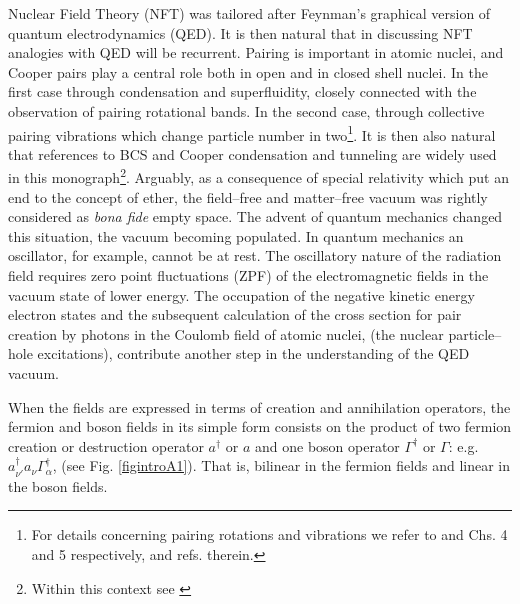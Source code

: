 Nuclear Field Theory (NFT) was tailored after Feynman's graphical version of quantum electrodynamics (QED). It is then natural that in discussing NFT analogies with QED will be recurrent. Pairing is important in atomic nuclei, and Cooper pairs play a central role both in open and in closed shell nuclei. In the first case through condensation and superfluidity, closely connected with the observation of pairing rotational bands. In the second case, through collective pairing vibrations which change particle number in two\footnote{For details concerning pairing rotations and vibrations we refer to \cite{Bes:77} and \cite{Brink:05} Chs. 4 and 5 respectively, and refs. therein.}. It is then also natural that references to BCS and Cooper condensation and tunneling are widely used in this monograph\footnote{Within this context see \cite{Broglia:13}}. Arguably, as a consequence of special relativity which put an end to the concept of ether, the field--free and matter--free vacuum was rightly considered as \textit{bona fide} empty space. The advent of quantum mechanics changed this situation, the vacuum becoming populated. In quantum mechanics an oscillator, for example, cannot be at rest. The oscillatory nature of the radiation field requires zero point fluctuations (ZPF) of the electromagnetic fields in the vacuum state of lower energy. The occupation of the negative kinetic energy electron states and the subsequent calculation of the cross section for pair creation by photons in the Coulomb field of atomic nuclei, (the nuclear particle--hole excitations), contribute another step in the understanding of the QED vacuum.


When the fields are expressed in terms of creation and annihilation operators, the fermion and boson fields in its simple form consists on the product of two fermion creation or destruction operator $a^\dagger$ or $a$ and one boson operator $\Gamma^\dagger$ or $\Gamma$: e.g. $a^\dagger_{\nu'}a_\nu\Gamma_\alpha^\dagger$, (see Fig. \ref{figintroA1}). That is,  bilinear in the fermion fields and linear in the boson fields.

